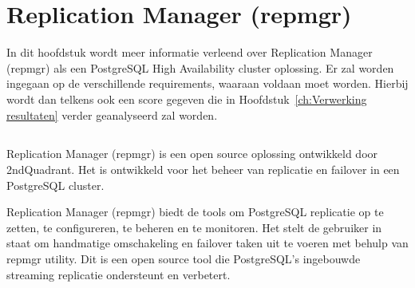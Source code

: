 
\chapter{Replication Manager (repmgr)}
\label{ch:Replication Manager (repmgr)}

In dit hoofdstuk wordt meer informatie verleend over Replication Manager (repmgr) als een PostgreSQL High Availability cluster oplossing. Er zal worden ingegaan op de verschillende requirements, waaraan voldaan moet worden. Hierbij wordt dan telkens ook een score gegeven die in Hoofdstuk~\ref{ch:Verwerking resultaten} verder geanalyseerd zal worden.

\section{}
\label{sec:Inleiding tot Replication Manager (repmgr)}

Replication Manager (repmgr) is een open source oplossing ontwikkeld door 2ndQuadrant. Het is ontwikkeld voor het beheer van replicatie en failover in een PostgreSQL cluster.

Replication Manager (repmgr) biedt de tools om PostgreSQL replicatie op te zetten, te configureren, te beheren en te monitoren. Het stelt de gebruiker in staat om handmatige omschakeling en failover taken uit te voeren met behulp van repmgr utility. Dit is een open source tool die PostgreSQL's ingebouwde streaming replicatie ondersteunt en verbetert.

\section{}
\label{sec:Requirements}

\subsection{}
\label{subsec:Must have}


